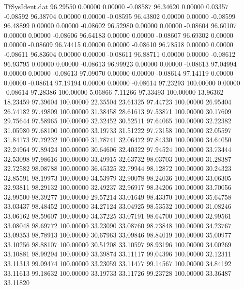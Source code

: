 \begin{filecontents}{TfSysIdent.dat}
  96.29550    0.00000    0.00000   -0.08587
  96.34620    0.00000    0.03357   -0.08592
  96.38704    0.00000    0.00000   -0.08595
  96.43802    0.00000    0.00000   -0.08599
  96.48899    0.00000    0.00000   -0.08602
  96.52980    0.00000    0.00000   -0.08604
  96.60107    0.00000    0.00000   -0.08606
  96.64183    0.00000    0.00000   -0.08607
  96.69302    0.00000    0.00000   -0.08609
  96.74415    0.00000    0.00000   -0.08610
  96.78518    0.00000    0.00000   -0.08611
  96.83604    0.00000    0.00000   -0.08611
  96.88711    0.00000    0.00000   -0.08612
  96.93795    0.00000    0.00000   -0.08613
  96.99923    0.00000    0.00000   -0.08613
  97.04994    0.00000    0.00000   -0.08613
  97.09070    0.00000    0.00000   -0.08614
  97.14119    0.00000    0.00000   -0.08614
  97.19194    0.00000    0.00000   -0.08614
  97.23293  100.00000    0.00000   -0.08614
  97.28386  100.00000    5.06866    7.11266
  97.33493  100.00000   13.96362   18.23459
  97.39604  100.00000   22.35504   23.61325
  97.44723  100.00000   26.95404   26.74182
  97.49809  100.00000   31.38458   28.61613
  97.53871  100.00000   30.17609   29.75644
  97.58965  100.00000   32.32452   30.52511
  97.64065  100.00000   32.22382   31.05980
  97.68100  100.00000   33.19733   31.51222
  97.73158  100.00000   32.05597   31.84173
  97.79232  100.00000   31.78741   32.06472
  97.84330  100.00000   34.64050   32.24964
  97.89424  100.00000   30.64606   32.40322
  97.94524  100.00000   33.73444   32.53098
  97.98616  100.00000   33.49915   32.63732
  98.03703  100.00000   31.28387   32.72582
  98.08788  100.00000   36.45325   32.79944
  98.12872  100.00000   30.24323   32.85591
  98.19973  100.00000   34.53979   32.90078
  98.24036  100.00000   33.06305   32.93811
  98.29132  100.00000   32.49237   32.96917
  98.34206  100.00000   33.70056   32.99500
  98.39277  100.00000   29.57214   33.01649
  98.43370  100.00000   35.64758   33.03437
  98.48452  100.00000   34.27124   33.04925
  98.53532  100.00000   31.08246   33.06162
  98.59607  100.00000   34.37225   33.07191
  98.64700  100.00000   32.99561   33.08048
  98.69772  100.00000   33.23090   33.08760
  98.73848  100.00000   34.23767   33.09353
  98.78913  100.00000   30.67963   33.09846
  98.84019  100.00000   35.00977   33.10256
  98.88107  100.00000   30.51208   33.10597
  98.93196  100.00000   34.00269   33.10881
  98.99294  100.00000   33.39874   33.11117
  99.04396  100.00000   32.12311   33.11313
  99.09474  100.00000   33.23059   33.11477
  99.14567  100.00000   34.84192   33.11613
  99.18632  100.00000   33.19733   33.11726
  99.23728  100.00000   33.36487   33.11820

\end{filecontents}
